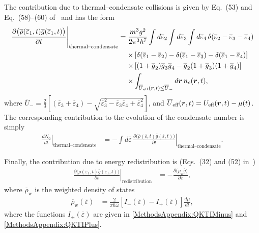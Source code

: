 The contribution due to thermal--condensate collisions is given by Eq.~(53) and Eq.~(58)--(60) of~\citep{Bijlsma:2000} and has the form
\begin{align}
    \begin{split}
        \left. \frac{\partial\big(\overline{\rho}(\overline{\varepsilon}_1, t) \overline{g}(\overline{\varepsilon}_1, t)\big)}{\partial t}\right|_\text{thermal--condensate} &= \frac{m^3 g^2}{2 \pi^3 \hbar^7} \int d \overline{\varepsilon}_2 \int d\overline{\varepsilon}_3 \int d\overline{\varepsilon}_4 \,\delta(\overline{\varepsilon}_2 - \overline{\varepsilon}_3 - \overline{\varepsilon}_4)\\
        &\relphantom{=}\times\left[ \delta(\overline{\varepsilon}_1 - \overline{\varepsilon}_2) - \delta(\overline{\varepsilon}_1 - \overline{\varepsilon}_3) - \delta(\overline{\varepsilon}_1- \overline{\varepsilon}_4)\right]\\
        &\relphantom{=} \times \left[(1+\overline{g}_2)\overline{g}_3 \overline{g}_4 - \overline{g}_2 (1+\overline{g}_3)(1+\overline{g}_4) \right]\\
        &\relphantom{=}\times  \int_{\overline{U}_\text{eff}(\vect{r}, t) \leq \overline{U}_-} d \vect{r}\, n_c(\vect{r}, t),
    \end{split}
    \label{MethodsAppendix:QKTRhoGThermalCondensateEvolution}
\end{align}
where $\displaystyle \overline{U}_- = \frac{2}{3}\left[(\overline{\varepsilon}_3 + \overline{\varepsilon}_4)-\sqrt{\overline{\varepsilon}_3^2 - \overline{\varepsilon}_3 \overline{\varepsilon}_4 + \overline{\varepsilon}_4^2}\right]$, and $\overline{U}_\text{eff}(\bm{r}, t) = U_\text{eff}(\bm{r}, t) - \mu(t)$.
The corresponding contribution to the evolution of the condensate number is simply
\begin{align}
    \left. \frac{d N_0}{d t}\right|_\text{thermal--condensate} &= - \int d\overline{\varepsilon} \,\left. \frac{\partial\big(\overline{\rho}(\overline{\varepsilon}, t) \overline{g}(\overline{\varepsilon}, t)\big)}{\partial t}\right|_\text{thermal--condensate}.
    \label{MethodsAppendix:QKTNThermalCondensateEvolution}
\end{align}


Finally, the contribution due to energy redistribution is (Eqs.~(32) and (52) in~\citep{Bijlsma:2000})
\begin{align}
    \left. \frac{\partial\big(\overline{\rho}(\overline{\varepsilon}_1, t) \overline{g}(\overline{\varepsilon}_1, t)\big)}{\partial t}\right|_\text{redistribution} &= - \frac{\partial \big( \overline{\rho}_\text{w} \overline{g}\big)}{\partial \overline{\varepsilon}},
    \label{MethodsAppendix:QKTRedistributionEvolution}
\end{align}
where $\overline{\rho}_\text{w}$ is the weighted density of states
\begin{align}
    \overline{\rho}_\text{w}(\overline{\varepsilon}) &= \frac{2}{\pi \hbar \overline{\omega}} \left[ I_-(\overline{\varepsilon}) - I_+(\overline{\varepsilon})\right] \frac{d \mu}{dt},
\end{align}
where the functions $I_\pm(\overline{\varepsilon})$ are given in \eqref{MethodsAppendix:QKTIMinus} and \eqref{MethodsAppendix:QKTIPlus}.


